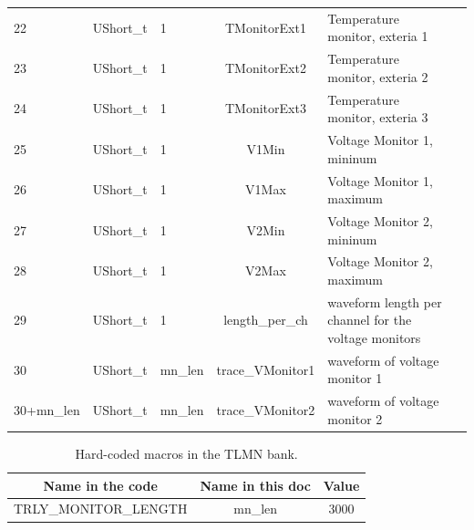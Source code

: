 \begin{table}[htbp]
\begin{tabular}{|C{2cm}|c|C{1.5cm}|c|C{4cm}|c|}
22               & UShort\_t  & 1            & TMonitorExt1             & Temperature monitor, exteria 1                         &                             \\
23               & UShort\_t  & 1            & TMonitorExt2             & Temperature monitor, exteria 2                         &                             \\
24               & UShort\_t  & 1            & TMonitorExt3             & Temperature monitor, exteria 3                         &                             \\
25               & UShort\_t  & 1            & V1Min                    & Voltage Monitor 1, mininum                             &                             \\
26               & UShort\_t  & 1            & V1Max                    & Voltage Monitor 1, maximum                             &                             \\
27               & UShort\_t  & 1            & V2Min                    & Voltage Monitor 2, mininum                             &                             \\
28               & UShort\_t  & 1            & V2Max                    & Voltage Monitor 2, maximum                             &                             \\
29               & UShort\_t  & 1            & length\_per\_ch          & waveform length per channel for the voltage monitors   &                             \\
30               & UShort\_t  & mn\_len      & trace\_VMonitor1         & waveform of voltage monitor 1                          &                             \\
30+mn\_len       & UShort\_t  & mn\_len      & trace\_VMonitor2         & waveform of voltage monitor 2                         &     \\
\hline
\end{tabular} 
\label{tab:tlmntable}
\end{table}


\begin{table}[htbp]
\centering
\caption{Hard-coded macros in the TLMN bank.}
\begin{tabular}{|c|c|c|}
\hline
Name in the code	& Name in this doc & Value \\
\hline
TRLY\_MONITOR\_LENGTH & mn\_len & 3000 \\
\hline
\end{tabular} 
\label{tab:tlmnmacro}
\end{table}


